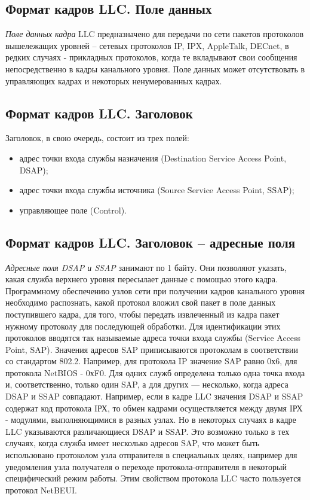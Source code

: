 \subsection{Формат кадров LLC. Поле данных}

\emph{Поле данных кадра} LLC предназначено для передачи по сети пакетов протоколов вышележащих уровней – сетевых протоколов IP, IPX, AppleTalk, DECnet, в редких случаях - прикладных протоколов, когда те вкладывают свои сообщения непосредственно в кадры канального уровня.
Поле данных может отсутствовать в управляющих кадрах и некоторых ненумерованных кадрах.

\subsection{Формат кадров LLC. Заголовок}

Заголовок, в свою очередь, состоит из трех полей:
\begin{itemize}
    \item адрес точки входа службы назначения (Destination Service Access Point, DSAP);
    \item адрес точки входа службы источника (Source Service Access Point, SSAP);
    \item управляющее поле (Control).
\end{itemize}

\subsection{Формат кадров LLC. Заголовок – адресные поля}

\emph{Адресные поля DSAP и SSAP} занимают по 1 байту.
Они позволяют указать, какая служба верхнего уровня пересылает данные с помощью этого кадра.
Программному обеспечению узлов сети при получении кадров канального уровня необходимо распознать, какой протокол вложил свой пакет в поле данных поступившего кадра, для того, чтобы передать извлеченный из кадра пакет нужному протоколу для последующей обработки.
Для идентификации этих протоколов вводятся так называемые адреса точки входа службы (Service  Access Point, SAP).
Значения адресов SAP приписываются протоколам в соответствии со стандартом 802.2.
Например, для протокола IP значение SAP равно 0х6, для протокола NetBIOS - 0хF0.
Для одних служб определена только одна точка входа и, соответственно, только один SAP, а для других — несколько, когда адреса DSAP и SSAP совпадают.
Например, если в кадре LLC значения DSAP и SSAP содержат код протокола IРХ, то обмен кадрами осуществляется между двумя IРХ - модулями, выполняющимися в разных узлах.
Но в некоторых случаях в кадре LLC указываются различающиеся DSAP и SSAP.
Это возможно только в тех случаях, когда служба имеет несколько адресов SAP, что может быть использовано протоколом узла отправителя в специальных целях, например для уведомления узла получателя о переходе протокола-отправителя в некоторый специфический режим работы.
Этим свойством протокола LLC часто пользуется протокол NetBEUI.

